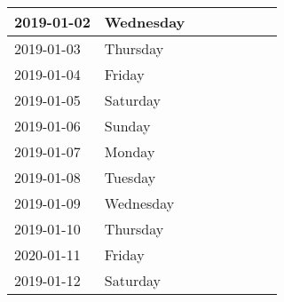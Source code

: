 \documentclass[10pt,a4paper]{article}
\begin{document}
\begin{longtable}{| p{} p{} | p{} | p{} | p{} | p{} | p{} | p{} |}
2019-01-02	&Wednesday	& & & & & &\\ \hline
2019-01-03	&Thursday	& & & & & &\\ \hline
2019-01-04	&Friday		& & & & & &\\ \hline
2019-01-05	&Saturday	& & & & & &\\ \hline
2019-01-06	&Sunday		& & & & & &\\ \hline
2019-01-07	&Monday		& & & & & &\\ \hline
2019-01-08	&Tuesday	& & & & & &\\ \hline
2019-01-09	&Wednesday	& & & & & &\\ \hline
2019-01-10	&Thursday	& & & & & &\\ \hline
2020-01-11	&Friday		& & & & & &\\ \hline
2019-01-12	&Saturday	& & & & & &\\ 
\hline \end{longtable} 
\end{document}
